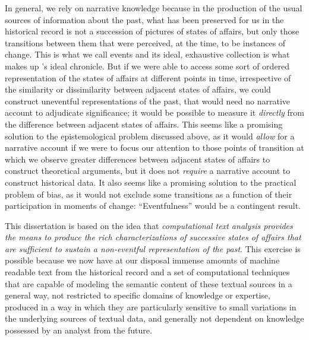 In general, we rely on narrative knowledge because in the production of the usual sources of information about the past, what has been preserved for us in the historical record is not a succession of pictures of states of affairs, but only those transitions between them that were perceived, at the time, to be instances of change.
This is what we call events and its ideal, exhaustive collection is what makes up \citeauthor{danto1985}'s ideal chronicle.
But if we were able to access some sort of ordered representation of the states of affairs at different points in time, irrespective of the similarity or dissimilarity between adjacent states of affairs, we could construct uneventful representations of the past, that would need no narrative account to adjudicate significance; it would be possible to measure it \emph{directly} from the difference between adjacent states of affairs.
This seems like a promising solution to the epistemological problem discussed above, as it would \emph{allow} for a narrative account if we were to focus our attention to those points of transition at which we observe greater differences between adjacent states of affairs to construct theoretical arguments, but it does not \emph{require} a narrative account to construct historical data.
It also seems like a promising solution to the practical problem of bias, as it would not exclude some transitions as a function of their participation in moments of change: ``Eventfulness'' would be a contingent result.

This dissertation is based on the idea that \emph{computational text analysis provides the means to produce the rich characterizations of successive states of affairs that are sufficient to sustain a non-eventful representation of the past}.
This exercise is possible because we now have at our disposal
    immense amounts of machine readable text from the historical record and
    a set of computational techniques that
    are capable of modeling the semantic content of these textual sources
    in a general way,
    not restricted to specific domains of knowledge or expertise,
    produced in a way in which they are particularly sensitive to small variations in the underlying sources of textual data,
    and generally not dependent on knowledge possessed by an analyst
    from the future.

